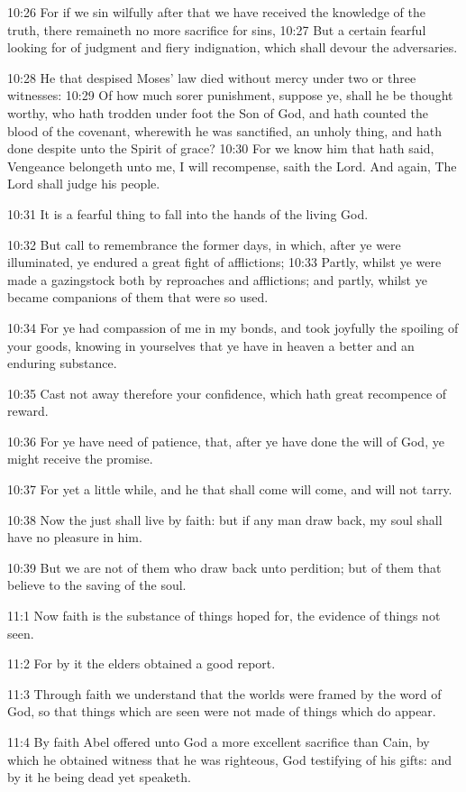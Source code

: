 10:26 For if we sin wilfully after that we have received the knowledge
of the truth, there remaineth no more sacrifice for sins, 10:27 But a
certain fearful looking for of judgment and fiery indignation, which
shall devour the adversaries.

10:28 He that despised Moses' law died without mercy under two or
three witnesses: 10:29 Of how much sorer punishment, suppose ye, shall
he be thought worthy, who hath trodden under foot the Son of God, and
hath counted the blood of the covenant, wherewith he was sanctified,
an unholy thing, and hath done despite unto the Spirit of grace?
10:30 For we know him that hath said, Vengeance belongeth unto me, I
will recompense, saith the Lord. And again, The Lord shall judge his
people.

10:31 It is a fearful thing to fall into the hands of the living God.

10:32 But call to remembrance the former days, in which, after ye were
illuminated, ye endured a great fight of afflictions; 10:33 Partly,
whilst ye were made a gazingstock both by reproaches and afflictions;
and partly, whilst ye became companions of them that were so used.

10:34 For ye had compassion of me in my bonds, and took joyfully the
spoiling of your goods, knowing in yourselves that ye have in heaven a
better and an enduring substance.

10:35 Cast not away therefore your confidence, which hath great
recompence of reward.

10:36 For ye have need of patience, that, after ye have done the will
of God, ye might receive the promise.

10:37 For yet a little while, and he that shall come will come, and
will not tarry.

10:38 Now the just shall live by faith: but if any man draw back, my
soul shall have no pleasure in him.

10:39 But we are not of them who draw back unto perdition; but of them
that believe to the saving of the soul.

11:1 Now faith is the substance of things hoped for, the evidence of
things not seen.

11:2 For by it the elders obtained a good report.

11:3 Through faith we understand that the worlds were framed by the
word of God, so that things which are seen were not made of things
which do appear.

11:4 By faith Abel offered unto God a more excellent sacrifice than
Cain, by which he obtained witness that he was righteous, God
testifying of his gifts: and by it he being dead yet speaketh.

